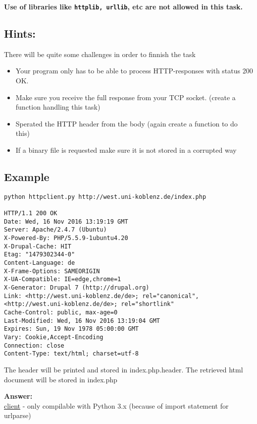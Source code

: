 \documentclass{WeSTassignment}
\begin{document}
\textbf{Use of libraries like \texttt{httplib, urllib}, etc are not allowed in this task.}

\subsection{Hints:}
There will be quite some challenges in order to finnish the task
\begin{itemize}
\item Your program only has to be able to process HTTP-responses with status 200 OK.
\item Make sure you receive the full response from your TCP socket. (create a function handling this task)
\item Sperated the HTTP header from the body (again create a function to do this)
\item If a binary file is requested make sure it is not stored in a corrupted way
\end{itemize}


\subsection{Example}
\begin{lstlisting}
python httpclient.py http://west.uni-koblenz.de/index.php

HTTP/1.1 200 OK
Date: Wed, 16 Nov 2016 13:19:19 GMT
Server: Apache/2.4.7 (Ubuntu)
X-Powered-By: PHP/5.5.9-1ubuntu4.20
X-Drupal-Cache: HIT
Etag: "1479302344-0"
Content-Language: de
X-Frame-Options: SAMEORIGIN
X-UA-Compatible: IE=edge,chrome=1
X-Generator: Drupal 7 (http://drupal.org)
Link: <http://west.uni-koblenz.de/de>; rel="canonical",<http://west.uni-koblenz.de/de>; rel="shortlink"
Cache-Control: public, max-age=0
Last-Modified: Wed, 16 Nov 2016 13:19:04 GMT
Expires: Sun, 19 Nov 1978 05:00:00 GMT
Vary: Cookie,Accept-Encoding
Connection: close
Content-Type: text/html; charset=utf-8

\end{lstlisting}
The header will be printed and stored in index.php.header. The retrieved html document will be stored in index.php

\textbf{Answer:} \\
\underline{client} - only compilable with Python 3.x (because of import statement for urlparse)\\





\end{document}
